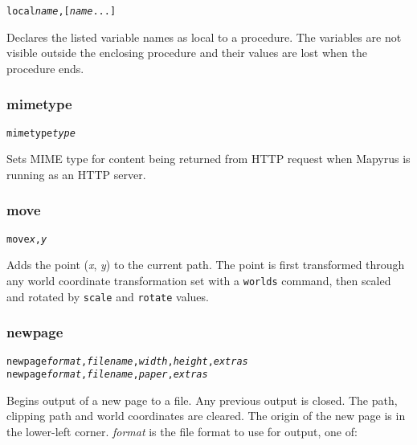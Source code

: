 \begin{alltt}
local \textit{name}, [\textit{name} ...]
\end{alltt}

Declares the listed variable names as local to a procedure.
The variables are not visible outside the enclosing procedure
and their values are lost when the procedure ends.

\subsubsection{mimetype}

\begin{alltt}
mimetype \textit{type}
\end{alltt}

Sets MIME type for content being returned from HTTP request
when Mapyrus is running as an HTTP server.

\subsubsection{move}

\begin{alltt}
move \textit{x}, \textit{y}
\end{alltt}

Adds the point (\textit{x}, \textit{y}) to the current path.  The
point is first transformed through any world coordinate
transformation set with a \texttt{worlds} command,
then scaled and rotated by \texttt{scale}
and \texttt{rotate} values.

\subsubsection{newpage}

\begin{alltt}
newpage \textit{format}, \textit{filename}, \textit{width}, \textit{height}, \textit{extras}
newpage \textit{format}, \textit{filename}, \textit{paper}, \textit{extras}
\end{alltt}

Begins output of a new page to a file.  Any previous output is closed.  The
path, clipping path and world coordinates are cleared.  The origin of
the new page is in the lower-left corner.  \textit{format} is the
file format to use for output, one of:

